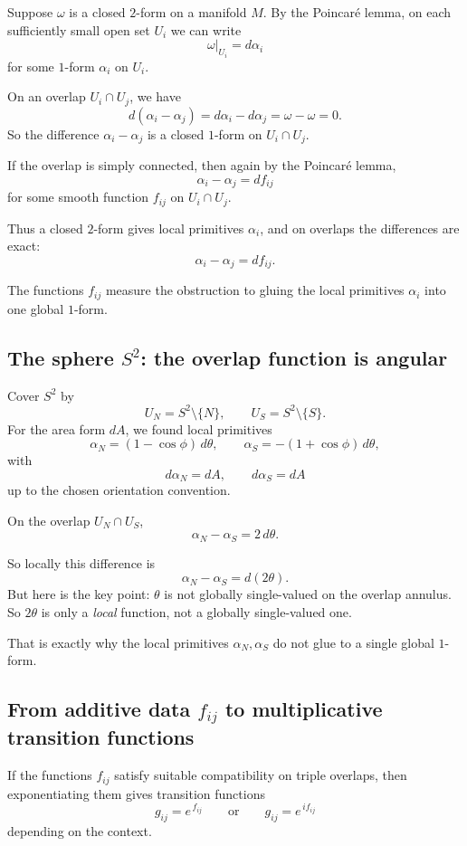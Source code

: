 \documentclass[11pt]{article}
\begin{document}
	Suppose \(\omega\) is a closed \(2\)-form on a manifold \(M\). By the Poincar\'e lemma, on each sufficiently small open set \(U_i\) we can write
	\[
	\omega|_{U_i}=d\alpha_i
	\]
	for some \(1\)-form \(\alpha_i\) on \(U_i\).
	
	On an overlap \(U_i\cap U_j\), we have
	\[
	d(\alpha_i-\alpha_j)=d\alpha_i-d\alpha_j=\omega-\omega=0.
	\]
	So the difference \(\alpha_i-\alpha_j\) is a closed \(1\)-form on \(U_i\cap U_j\).
	
	If the overlap is simply connected, then again by the Poincar\'e lemma,
	\[
	\alpha_i-\alpha_j = df_{ij}
	\]
	for some smooth function \(f_{ij}\) on \(U_i\cap U_j\).
	
	Thus a closed \(2\)-form gives local primitives \(\alpha_i\), and on overlaps the differences are exact:
	\[
	\alpha_i-\alpha_j = df_{ij}.
	\]
	
	The functions \(f_{ij}\) measure the obstruction to gluing the local primitives \(\alpha_i\) into one global \(1\)-form.
	
	\subsection*{The sphere \(S^2\): the overlap function is angular}
	
	Cover \(S^2\) by
	\[
	U_N=S^2\setminus\{N\},
	\qquad
	U_S=S^2\setminus\{S\}.
	\]
	For the area form \(dA\), we found local primitives
	\[
	\alpha_N=(1-\cos\phi)\,d\theta,
	\qquad
	\alpha_S=-(1+\cos\phi)\,d\theta,
	\]
	with
	\[
	d\alpha_N=dA,
	\qquad
	d\alpha_S=dA
	\]
	up to the chosen orientation convention.
	
	On the overlap \(U_N\cap U_S\),
	\[
	\alpha_N-\alpha_S=2\,d\theta.
	\]
	
	So locally this difference is
	\[
	\alpha_N-\alpha_S=d(2\theta).
	\]
	But here is the key point: \(\theta\) is not globally single-valued on the overlap annulus. So \(2\theta\) is only a \emph{local} function, not a globally single-valued one.
	
	That is exactly why the local primitives \(\alpha_N,\alpha_S\) do not glue to a single global \(1\)-form.
	
	\subsection*{From additive data \(f_{ij}\) to multiplicative transition functions}
	
	If the functions \(f_{ij}\) satisfy suitable compatibility on triple overlaps, then exponentiating them gives transition functions
	\[
	g_{ij}=e^{\,f_{ij}}
	\qquad\text{or}\qquad
	g_{ij}=e^{\,i f_{ij}}
	\]
	depending on the context.
	
\end{document}
